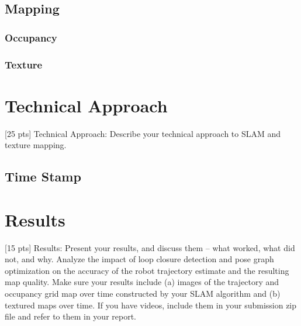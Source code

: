 \documentclass[conference]{IEEEtran}
\begin{document}
\subsection{Mapping}
\subsubsection{Occupancy}

\subsubsection{Texture}


\section{Technical Approach}
[25 pts] Technical Approach: Describe your technical approach to SLAM and texture mapping.
\subsection{Time Stamp}


\section{Results}
[15 pts] Results: Present your results, and discuss them – what worked, what did not, and why.
Analyze the impact of loop closure detection and pose graph optimization on the accuracy of the robot
trajectory estimate and the resulting map quality. Make sure your results include (a) images of the
trajectory and occupancy grid map over time constructed by your SLAM algorithm and (b) textured
maps over time. If you have videos, include them in your submission zip file and refer to them in your
report.
\end{document}
